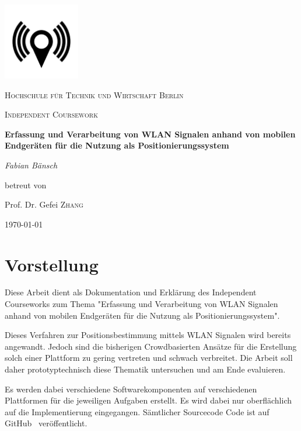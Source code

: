 \documentclass[11pt,a4paper]{article}
\begin{document}
 


\begin{titlepage}
	\centering
	\includegraphics[width=0.25\textwidth]{pics/airsniffer.png}\par\vspace{1cm}
	{\scshape\LARGE Hochschule für Technik und Wirtschaft Berlin \par}
	\vspace{1cm}
	{\scshape\Large Independent Coursework\par}
	\vspace{1.5cm}
	{\huge\bfseries Erfassung und Verarbeitung von WLAN Signalen anhand von mobilen Endgeräten für die Nutzung als Positionierungssystem\par}
	\vspace{2cm}
	{\Large\itshape Fabian Bänsch\par}
	\vfill
	betreut von\par
	Prof. Dr. Gefei \textsc{Zhang}

	\vfill

	{\large \today\par}
\end{titlepage}

\tableofcontents{}

\newpage

\section{Vorstellung}

Diese Arbeit dient als Dokumentation und Erklärung des Independent Courseworks zum Thema "Erfassung und Verarbeitung von WLAN Signalen anhand von mobilen Endgeräten für die Nutzung als Positionierungssystem".

Dieses Verfahren zur Positionsbestimmung mittels WLAN Signalen wird bereits angewandt. Jedoch sind die bisherigen Crowdbasierten Ansätze für die Erstellung solch einer Plattform zu gering vertreten und schwach verbreitet. Die Arbeit soll daher prototyptechnisch diese Thematik untersuchen und am Ende evaluieren.

Es werden dabei verschiedene Softwarekomponenten auf verschiedenen Plattformen für die jeweiligen Aufgaben erstellt. Es wird dabei nur oberflächlich auf die Implementierung eingegangen. Sämtlicher Sourcecode Code ist auf GitHub~\cite{github} veröffentlicht. 
\end{document}
